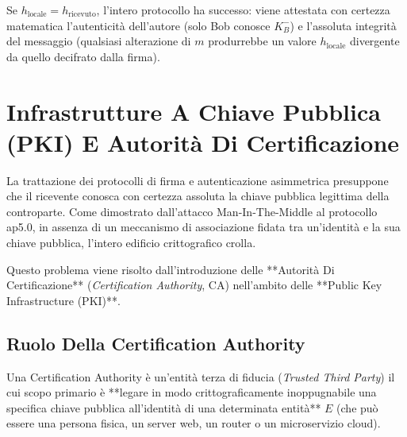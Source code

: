 \documentclass[11pt, a4paper]{article}
\begin{document}
Se $h_{\text{locale}} = h_{\text{ricevuto}}$, l'intero protocollo ha successo: viene attestata con certezza matematica l'autenticità dell'autore (solo Bob conosce $K_B^-$) e l'assoluta integrità del messaggio (qualsiasi alterazione di $m$ produrrebbe un valore $h_{\text{locale}}$ divergente da quello decifrato dalla firma).

\newpage

\section{Infrastrutture A Chiave Pubblica (PKI) E Autorità Di Certificazione}

La trattazione dei protocolli di firma e autenticazione asimmetrica presuppone che il ricevente conosca con certezza assoluta la chiave pubblica legittima della controparte. Come dimostrato dall'attacco Man-In-The-Middle al protocollo ap5.0, in assenza di un meccanismo di associazione fidata tra un'identità e la sua chiave pubblica, l'intero edificio crittografico crolla.

Questo problema viene risolto dall'introduzione delle **Autorità Di Certificazione** (\emph{Certification Authority}, CA) nell'ambito delle **Public Key Infrastructure (PKI)**.

\subsection{Ruolo Della Certification Authority}

Una Certification Authority è un'entità terza di fiducia (\emph{Trusted Third Party}) il cui scopo primario è **legare in modo crittograficamente inoppugnabile una specifica chiave pubblica all'identità di una determinata entità** $E$ (che può essere una persona fisica, un server web, un router o un microservizio cloud).

\end{document}
